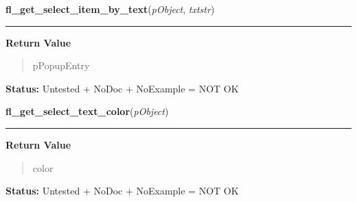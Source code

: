     \vspace{0.5ex}

\hspace{.8\funcindent}\begin{boxedminipage}{\funcwidth}

    \raggedright \textbf{fl\_get\_select\_item\_by\_text}(\textit{pObject}, \textit{txtstr})

    \vspace{-1.5ex}

    \rule{\textwidth}{0.5\fboxrule}
\setlength{\parskip}{2ex}
\setlength{\parskip}{1ex}
      \textbf{Return Value}
    \vspace{-1ex}

      \begin{quote}
      pPopupEntry

      \end{quote}

\textbf{Status:} Untested + NoDoc + NoExample = NOT OK



    \end{boxedminipage}

    \label{xformslib:library:fl_get_select_text_color}

    \vspace{0.5ex}

\hspace{.8\funcindent}\begin{boxedminipage}{\funcwidth}

    \raggedright \textbf{fl\_get\_select\_text\_color}(\textit{pObject})

    \vspace{-1.5ex}

    \rule{\textwidth}{0.5\fboxrule}
\setlength{\parskip}{2ex}
\setlength{\parskip}{1ex}
      \textbf{Return Value}
    \vspace{-1ex}

      \begin{quote}
      color

      \end{quote}

\textbf{Status:} Untested + NoDoc + NoExample = NOT OK



    \end{boxedminipage}

    \label{xformslib:library:fl_set_select_text_color}

